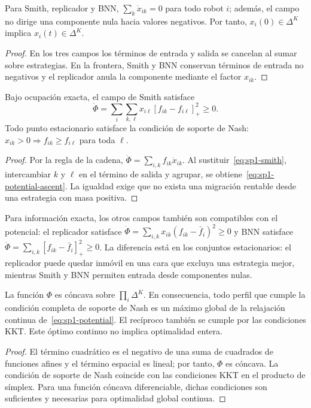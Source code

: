 \begin{proposicion}
Para Smith, replicador y BNN, $\sum_k\dot x_{ik}=0$ para todo robot $i$; además,
el campo no dirige una componente nula hacia valores negativos. Por tanto,
$x_i(0)\in\Delta^K$ implica $x_i(t)\in\Delta^K$.
\end{proposicion}
\begin{proof}
En los tres campos los términos de entrada y salida se cancelan al sumar sobre
estrategias. En la frontera, Smith y BNN conservan términos de entrada no negativos
y el replicador anula la componente mediante el factor $x_{ik}$.
\end{proof}

\begin{proposicion}
Bajo ocupación exacta, el campo de Smith satisface
\begin{equation}
 \dot\Phi=\sum_i\sum_{k,\ell}x_{i\ell}
 [f_{ik}-f_{i\ell}]_+^2\geq0.
 \label{eq:sp1-potential-ascent}
\end{equation}
Todo punto estacionario satisface la condición de soporte de Nash:
$x_{ik}>0\Rightarrow f_{ik}\geq f_{i\ell}$ para toda $\ell$.
\end{proposicion}
\begin{proof}
Por la regla de la cadena, $\dot\Phi=\sum_{i,k}f_{ik}\dot x_{ik}$.
Al sustituir~\eqref{eq:sp1-smith}, intercambiar $k$ y $\ell$ en el término de
salida y agrupar, se obtiene~\eqref{eq:sp1-potential-ascent}. La igualdad exige
que no exista una migración rentable desde una estrategia con masa positiva.
\end{proof}

Para información exacta, los otros campos también son compatibles con el potencial:
el replicador satisface $\dot\Phi=\sum_{i,k}x_{ik}(f_{ik}-\bar f_i)^2\geq0$
y BNN satisface $\dot\Phi=\sum_{i,k}[f_{ik}-\bar f_i]_+^2\geq0$.
La diferencia está en los conjuntos estacionarios: el replicador puede quedar inmóvil
en una cara que excluya una estrategia mejor, mientras Smith y BNN permiten entrada
desde componentes nulas.

\begin{proposicion}
La función $\Phi$ es cóncava sobre $\prod_i\Delta^K$. En consecuencia, todo
perfil que cumple la condición completa de soporte de Nash es un máximo global de
la relajación continua de~\eqref{eq:sp1-potential}. El recíproco también se cumple
por las condiciones KKT. Este óptimo continuo no implica optimalidad entera.
\end{proposicion}
\begin{proof}
El término cuadrático es el negativo de una suma de cuadrados de funciones afines
y el término espacial es lineal; por tanto, $\Phi$ es cóncava. La condición de
soporte de Nash coincide con las condiciones KKT en el producto de símplex. Para
una función cóncava diferenciable, dichas condiciones son suficientes y necesarias
para optimalidad global continua.
\end{proof}

